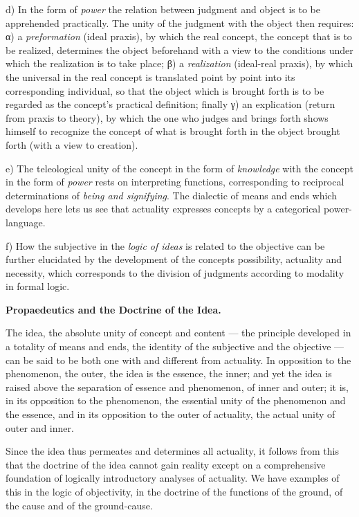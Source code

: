 \documentclass[12pt,a4paper,openany]{book}
\newcommand{\opage}[1]{\marginnote{\footnotesize\textit{[#1]}}}
\begin{document}
d) In the form of \emph{power} the relation between judgment and object is to be apprehended practically. The unity
of the judgment with the object then requires: α) a \emph{preformation} (ideal praxis), by which the real concept,
the concept that is to be realized, determines the object beforehand with a view to the conditions under which the
realization is to take place; β) a \emph{realization} (ideal-real praxis), by which the universal in the real concept
is translated point by point into its corresponding individual, so that the object %
\opage{5}which is brought forth is to be regarded as the concept's practical definition; finally γ) an explication
(return from praxis to theory), by which the one who judges and brings forth shows himself to recognize the concept of
what is brought forth in the object brought forth (with a view to creation).

e) The teleological unity of the concept in the form of \emph{knowledge} with the concept in the form of \emph{power}
rests on interpreting functions, corresponding to reciprocal determinations of \emph{being and signifying}. The
dialectic of means and ends which develops here lets us see that actuality expresses concepts by a categorical
power-language.

f) How the subjective in the \emph{logic of ideas} is related to the objective can be further elucidated by the
development of the concepts possibility, actuality and necessity, which corresponds to the division of judgments
according to modality in formal logic.

\begin{center}\textbf{Propaedeutics and the Doctrine of the Idea.}\end{center}

The idea, the absolute unity of concept and content --- the principle developed in a totality of means and ends, the
identity of the subjective and the objective --- can be said to be both one with and different from actuality. In
opposition to the phenomenon, the outer, the idea is the essence, the inner; and yet the idea is raised above the
separation of essence and phenomenon, of inner and outer; it is, in its opposition to the phenomenon, the essential
unity of the phenomenon and the essence, and in its opposition to the outer of actuality, the actual unity of outer
and inner.

Since the idea thus permeates and determines all actuality, it follows from this that the doctrine of the idea cannot
gain reality except on a comprehensive foundation of logically introductory analyses of actuality. We have examples
of this in the logic of objectivity, in the doctrine of the functions of the ground, of the cause and of the
ground-cause.
\end{document}
